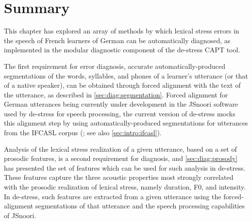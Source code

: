	

\section{Summary}
\label{sec:diag:summary}


	This chapter has explored an array of methods by which lexical stress errors in the speech of French learners of German can be automatically diagnosed, as implemented in the modular diagnostic component of the de-stress CAPT tool.
	
	
	The first requirement for error diagnosis, accurate automatically-produced segmentations of the words, syllables, and phones of a learner's utterance (or that of a native speaker), can be obtained through forced alignment with the text of the utterance, as described in \cref{sec:diag:segmentation}. Forced alignment for German utterances being currently under development in the JSnoori software used by de-stress for speech processing, the current version of de-stress mocks this alignment step by using automatically-produced segmentations for utterances from the IFCASL corpus (\cite{Fauth2014,Trouvain2013}; see also \cref{sec:intro:ifcasl}).
	
	Analysis of the lexical stress realization of a given utterance, based on a set of prosodic features, is a second requirement for diagnosis, and \cref{sec:diag:prosody} has presented the set of features which can be used for such analysis in de-stress. These features capture the three acoustic properties most strongly correlated with the prosodic realization of lexical stress, namely duration, F0, and intensity. In de-stress, such features are extracted from a given utterance using the forced-alignment segmentations of that utterance and the speech processing capabilities of JSnoori.
	
